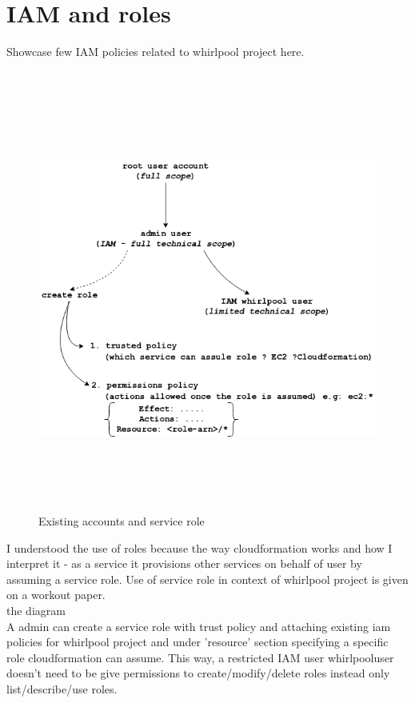 \section{IAM and roles}\label{iamroles}
Showcase few IAM policies related to whirlpool project here.
\\
\\
\begin{figure}[h!]
  \centering
  \includegraphics[width=14cm,height=14cm,keepaspectratio]{../media/crawler/iam_and_roles.png}
  \caption{Existing accounts and service role}
  \label{fig:iamroles}
\end{figure}

\noindent
I understood the use of roles because the way cloudformation works and how I interpret it - as a service it provisions other
services on behalf of user by assuming a service role. Use of service role in context of whirlpool project is given on a workout paper.
\\
the diagram
\\
A admin can create a service role with trust policy and attaching existing iam policies for whirlpool project and under 'resource'
section specifying a specific role cloudformation can assume. This way, a restricted IAM user whirlpooluser doesn't need to be give
permissions to create/modify/delete roles instead only list/describe/use roles. 

\pagebreak